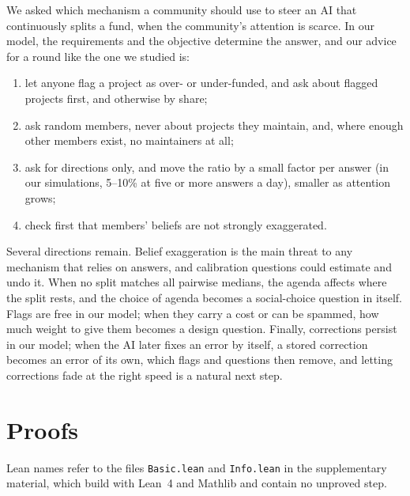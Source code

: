 \documentclass[doubleblind]{ecai}
\theoremstyle{remark}
\begin{document}
We asked which mechanism a community should use to steer an AI that continuously splits a fund, when the community's attention is scarce. In our model, the requirements and the objective determine the answer, and our advice for a round like the one we studied is:
\begin{enumerate}[leftmargin=*,nosep]
\item let anyone flag a project as over- or under-funded, and ask about flagged projects first, and otherwise by share;
\item ask random members, never about projects they maintain, and, where enough other members exist, no maintainers at all;
\item ask for directions only, and move the ratio by a small factor per answer (in our simulations, 5--10\% at five or more answers a day), smaller as attention grows;
\item check first that members' beliefs are not strongly exaggerated.
\end{enumerate}
Several directions remain. Belief exaggeration is the main threat to any mechanism that relies on answers, and calibration questions could estimate and undo it. When no split matches all pairwise medians, the agenda affects where the split rests, and the choice of agenda becomes a social-choice question in itself. Flags are free in our model; when they carry a cost or can be spammed, how much weight to give them becomes a design question. Finally, corrections persist in our model; when the AI later fixes an error by itself, a stored correction becomes an error of its own, which flags and questions then remove, and letting corrections fade at the right speed is a natural next step.



\appendix
\onecolumn
\section{Proofs}\label{app:proofs}

Lean names refer to the files \texttt{Basic.lean} and \texttt{Info.lean} in the supplementary material, which build with Lean~4 and Mathlib and contain no unproved step.
\end{document}
